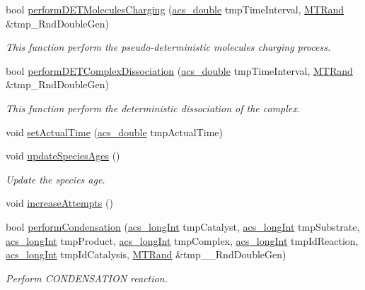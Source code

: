 \begin{DoxyCompactItemize}
bool \hyperlink{a00011_adbaf165a12edd62c614a455544807ea3}{perform\-D\-E\-T\-Molecules\-Charging} (\hyperlink{a00024_ab776853a005fcbf56af0424a2a4dd607}{acs\-\_\-double} tmp\-Time\-Interval, \hyperlink{a00016}{M\-T\-Rand} \&tmp\-\_\-\-Rnd\-Double\-Gen)
\begin{DoxyCompactList}\small\item\em This function perform the pseudo-\/deterministic molecules charging process. \end{DoxyCompactList}\item 
bool \hyperlink{a00011_a6ae793f9d2dca0632239be955dd83cee}{perform\-D\-E\-T\-Complex\-Dissociation} (\hyperlink{a00024_ab776853a005fcbf56af0424a2a4dd607}{acs\-\_\-double} tmp\-Time\-Interval, \hyperlink{a00016}{M\-T\-Rand} \&tmp\-\_\-\-Rnd\-Double\-Gen)
\begin{DoxyCompactList}\small\item\em This function perform the deterministic dissociation of the complex. \end{DoxyCompactList}\item 
void \hyperlink{a00011_a9bc445da3e89d09d4fce11c83f3dedb0}{set\-Actual\-Time} (\hyperlink{a00024_ab776853a005fcbf56af0424a2a4dd607}{acs\-\_\-double} tmp\-Actual\-Time)
\item 
void \hyperlink{a00011_adab0607255ca5927b69cb6882917e031}{update\-Species\-Ages} ()
\begin{DoxyCompactList}\small\item\em Update the species age. \end{DoxyCompactList}\item 
void \hyperlink{a00011_aac3eed768b89e3a70017075b68046ede}{increase\-Attempts} ()
\item 
bool \hyperlink{a00011_a1baf5512b7e0a8fb6f8f890ba9f99cd1}{perform\-Condensation} (\hyperlink{a00024_a19319d75f02db4308bc5c0026d98cd85}{acs\-\_\-long\-Int} tmp\-Catalyst, \hyperlink{a00024_a19319d75f02db4308bc5c0026d98cd85}{acs\-\_\-long\-Int} tmp\-Substrate, \hyperlink{a00024_a19319d75f02db4308bc5c0026d98cd85}{acs\-\_\-long\-Int} tmp\-Product, \hyperlink{a00024_a19319d75f02db4308bc5c0026d98cd85}{acs\-\_\-long\-Int} tmp\-Complex, \hyperlink{a00024_a19319d75f02db4308bc5c0026d98cd85}{acs\-\_\-long\-Int} tmp\-Id\-Reaction, \hyperlink{a00024_a19319d75f02db4308bc5c0026d98cd85}{acs\-\_\-long\-Int} tmp\-Id\-Catalysis, \hyperlink{a00016}{M\-T\-Rand} \&tmp\-\_\-\-\_\-\-Rnd\-Double\-Gen)
\begin{DoxyCompactList}\small\item\em Perform C\-O\-N\-D\-E\-N\-S\-A\-T\-I\-O\-N reaction. \end{DoxyCompactList}\item 

\end{DoxyCompactItemize}
